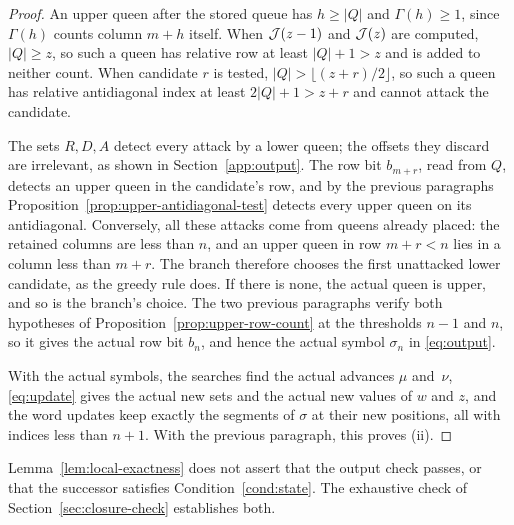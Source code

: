 \begin{proof}
An upper queen after the stored queue has $h\ge|Q|$ and
$\Gamma(h)\ge1$, since $\Gamma(h)$ counts column $m+h$ itself. When
$\mathcal J(z-1)$ and $\mathcal J(z)$ are computed, $|Q|\ge z$, so such a queen has
relative row at least $|Q|+1>z$ and is added to neither count. When
candidate $r$ is tested,
$|Q|>\lfloor(z+r)/2\rfloor$, so such a queen has relative
antidiagonal index at least $2|Q|+1>z+r$ and cannot attack the
candidate.

The sets $R,D,A$ detect every attack by a lower queen; the offsets
they discard are irrelevant, as shown in Section~\ref{app:output}. The
row bit $b_{m+r}$, read from $Q$, detects an upper queen in the
candidate's row, and by the previous paragraphs
Proposition~\ref{prop:upper-antidiagonal-test} detects every upper
queen on its antidiagonal. Conversely, all these attacks come from
queens already placed: the retained columns are less than $n$, and an
upper queen in row $m+r<n$ lies in a column less than $m+r$. The
branch therefore chooses the first unattacked lower candidate, as the
greedy rule does. If there is none, the actual queen is upper, and so
is the branch's choice. The two previous paragraphs verify both
hypotheses of Proposition~\ref{prop:upper-row-count} at the thresholds
$n-1$ and $n$, so it gives the actual row bit $b_n$, and hence the
actual symbol $\sigma_n$ in \eqref{eq:output}.

With the actual symbols, the searches find the actual advances $\mu$
and~$\nu$, \eqref{eq:update} gives the actual new sets and the actual
new values of $w$ and $z$, and the word updates keep exactly the
segments of $\sigma$ at their new positions, all with indices less
than $n+1$. With the previous paragraph, this proves (ii).
\end{proof}

Lemma~\ref{lem:local-exactness} does not assert that the output check
passes, or that the successor satisfies Condition~\ref{cond:state}. The exhaustive check
of Section~\ref{sec:closure-check} establishes both.
